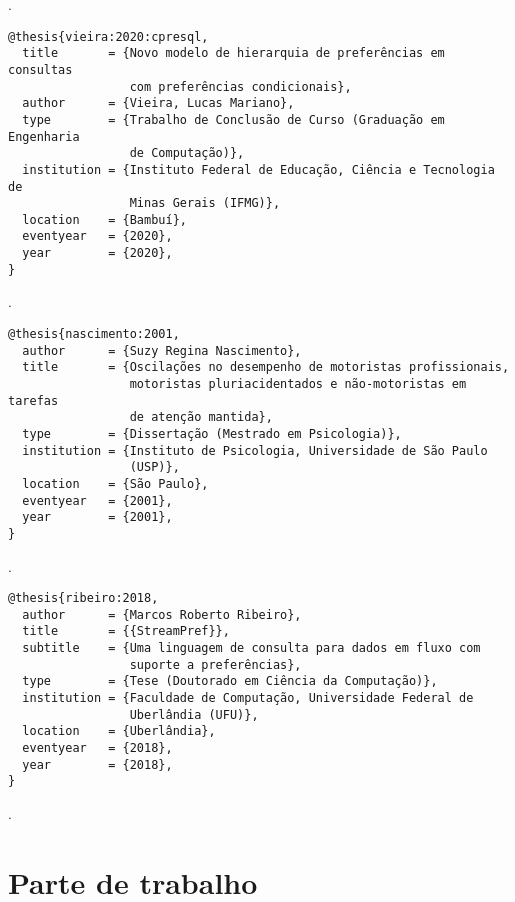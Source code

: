 \noindent
{}.

\vspace*{1em}

\begin{Verbatim}[frame=single]
@thesis{vieira:2020:cpresql,
  title       = {Novo modelo de hierarquia de preferências em consultas
                 com preferências condicionais},
  author      = {Vieira, Lucas Mariano},
  type        = {Trabalho de Conclusão de Curso (Graduação em Engenharia
                 de Computação)},
  institution = {Instituto Federal de Educação, Ciência e Tecnologia de
                 Minas Gerais (IFMG)},
  location    = {Bambuí},
  eventyear   = {2020},
  year        = {2020},
}
\end{Verbatim}

\noindent
{}.

\vspace*{1em}

\begin{Verbatim}[frame=single]
@thesis{nascimento:2001,
  author      = {Suzy Regina Nascimento},
  title       = {Oscilações no desempenho de motoristas profissionais,
                 motoristas pluriacidentados e não-motoristas em tarefas
                 de atenção mantida},
  type        = {Dissertação (Mestrado em Psicologia)},
  institution = {Instituto de Psicologia, Universidade de São Paulo
                 (USP)},
  location    = {São Paulo},
  eventyear   = {2001},
  year        = {2001},
}
\end{Verbatim}

\noindent
{}.

\vspace*{1em}

\begin{Verbatim}[frame=single]
@thesis{ribeiro:2018,
  author      = {Marcos Roberto Ribeiro},
  title       = {{StreamPref}},
  subtitle    = {Uma linguagem de consulta para dados em fluxo com
                 suporte a preferências},
  type        = {Tese (Doutorado em Ciência da Computação)},
  institution = {Faculdade de Computação, Universidade Federal de
                 Uberlândia (UFU)},
  location    = {Uberlândia},
  eventyear   = {2018},
  year        = {2018},
}
\end{Verbatim}

\noindent
{}.

\section{Parte de trabalho}

